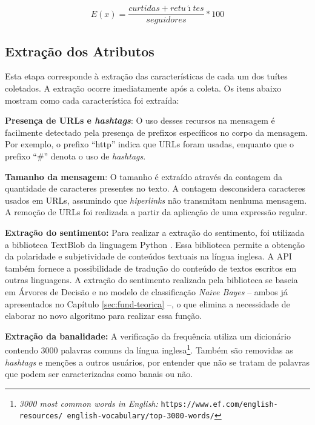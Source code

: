 \documentclass[oneside,openright,12pt]{ufsm_2015} %
\begin{document}
    \begin{equation} \label{eq:engajamento-api}
    E(x) = \frac{curtidas + retu\acute{\imath}tes}{seguidores}*100
    \end{equation}


\subsection{Extração dos Atributos}
\label{sec:prop-extracao}

    \par Esta etapa corresponde à extração das características de cada um dos tuítes coletados. A extração ocorre imediatamente após a coleta. Os itens abaixo mostram como cada característica foi extraída:
    
    \par \textbf{Presença de URLs e \textit{hashtags}}: O uso desses recursos na mensagem é facilmente detectado pela presença de prefixos específicos no corpo da mensagem. Por exemplo, o prefixo ``http'' indica que URLs foram usadas, enquanto que o prefixo ``\#'' denota o uso de \textit{hashtags}. 
    
    \par \textbf{Tamanho da mensagem}: O tamanho é extraído através da contagem da quantidade de caracteres presentes no texto. A contagem desconsidera caracteres usados em URLs, assumindo que \textit{hiperlinks} não transmitam nenhuma mensagem.  A remoção de URLs foi realizada a partir da aplicação de uma expressão regular.

    \par \textbf{Extração do sentimento:} Para realizar a extração do sentimento, foi utilizada a biblioteca TextBlob da linguagem Python \cite{loria:14}. Essa biblioteca  permite a obtenção da polaridade e subjetividade de conteúdos textuais na língua inglesa. A API também fornece a possibilidade de tradução do conteúdo de textos escritos em outras linguagens. A extração do sentimento realizada pela biblioteca se baseia em Árvores de Decisão e no modelo de classificação \textit{Naive Bayes} -- ambos já apresentados no Capítulo \ref{sec:fund-teorica} --, o que elimina a necessidade de elaborar no novo algoritmo para realizar essa função. 

    \par \textbf{Extração da banalidade:} A verificação da frequência utiliza um dicionário contendo 3000 palavras comuns da língua inglesa\footnote{\textit{3000 most common words in English: }\texttt{https://www.ef.com/english-resources/ english-vocabulary/top-3000-words/}}. Também são removidas as \textit{hashtags} e menções a outros usuários, por entender que não se tratam de palavras que podem ser caracterizadas como banais ou não.
    
\end{document}
